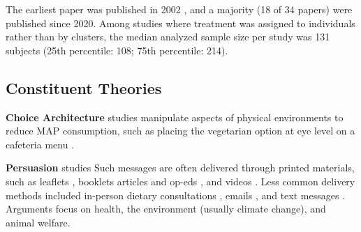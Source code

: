 \documentclass[sn-nature,referee,pdflatex]{sn-jnl}
\begin{document}
The earliest paper was published in 2002 \citep{allen2002}, and a
majority (18 of 34 papers) were published since 2020. Among studies
where treatment was assigned to individuals rather than by clusters, the
median analyzed sample size per study was 131 subjects (25th percentile:
108; 75th percentile: 214).

\subsection{Constituent Theories}\label{sec2.2}

\textbf{Choice Architecture} studies
\citep{andersson2021, kanchanachitra2020} manipulate aspects of physical
environments to reduce MAP consumption, such as placing the vegetarian
option at eye level on a cafeteria menu \citep{andersson2021}.

\textbf{Persuasion} studies
\citep{kanchanachitra2020, abrahamse2007, acharya2004, banerjee2019, bianchi2022, bochmann2017, bschaden2020, carfora2023, hennessy2016, piester2020, cooney2014, cooney2016, feltz2022, haile2021, hatami2018, jalil2023, mathur2021effectiveness, merrill2009, norris2014, peacock2017, polanco2022, sparkman2021, weingarten2022}
Such messages are often delivered through printed materials, such as
leaflets \citep{haile2021, polanco2022}, booklets \citep{bianchi2022}
articles and op-eds \citep{sparkman2021, feltz2022}, and videos
\citep{sparkman2021, cooney2016, mathur2021effectiveness}. Less common
delivery methods included in-person dietary consultations
\citep{merrill2009}, emails \citep{banerjee2019}, and text messages
\citep{carfora2023}. Arguments focus on health, the environment (usually
climate change), and animal welfare.

\begin{comment}
Some are designed to be emotionally activating, e.g. presenting upsetting footage of factory farms [@polanco2022], while others present information more factually, for instance about the relationship between diet and cancer [@hatami2018].
Many persuasion studies combine arguments, such as a lecture on the health and environmental consequences of eating meat
These studies formed the majority of our database.
\end{comment}
\end{document}
